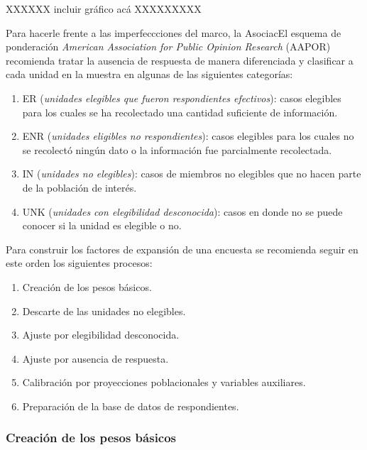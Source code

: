 \documentclass[
  12pt,
  spanish,
]{book}
\providecommand{\tightlist}{%
  \setlength{\itemsep}{0pt}\setlength{\parskip}{0pt}}
\begin{document}
XXXXXX incluir gráfico acá XXXXXXXXX

Para hacerle frente a las imperfeccciones del marco, la AsociacEl esquema de ponderación \emph{American Association for Public Opinion Research} (AAPOR) recomienda tratar la ausencia de respuesta de manera diferenciada y clasificar a cada unidad en la muestra en algunas de las siguientes categorías:

\begin{enumerate}
\def\labelenumi{\arabic{enumi}.}
\tightlist
\item
  ER (\emph{unidades elegibles que fueron respondientes efectivos}): casos elegibles para los cuales se ha recolectado una cantidad suficiente de información.
\item
  ENR (\emph{unidades eligibles no respondientes}): casos elegibles para los cuales no se recolectó ningún dato o la información fue parcialmente recolectada.
\item
  IN (\emph{unidades no elegibles}): casos de miembros no elegibles que no hacen parte de la población de interés.
\item
  UNK (\emph{unidades con elegibilidad desconocida}): casos en donde no se puede conocer si la unidad es elegible o no.
\end{enumerate}

Para construir los factores de expansión de una encuesta se recomienda seguir en este orden los siguientes procesos:

\begin{enumerate}
\def\labelenumi{\arabic{enumi}.}
\tightlist
\item
  Creación de los pesos básicos.
\item
  Descarte de las unidades no elegibles.
\item
  Ajuste por elegibilidad desconocida.
\item
  Ajuste por ausencia de respuesta.
\item
  Calibración por proyecciones poblacionales y variables auxiliares.
\item
  Preparación de la base de datos de respondientes.
\end{enumerate}

\hypertarget{creaciuxf3n-de-los-pesos-buxe1sicos}{%
\subsubsection*{Creación de los pesos básicos}\label{creaciuxf3n-de-los-pesos-buxe1sicos}}
\end{document}
